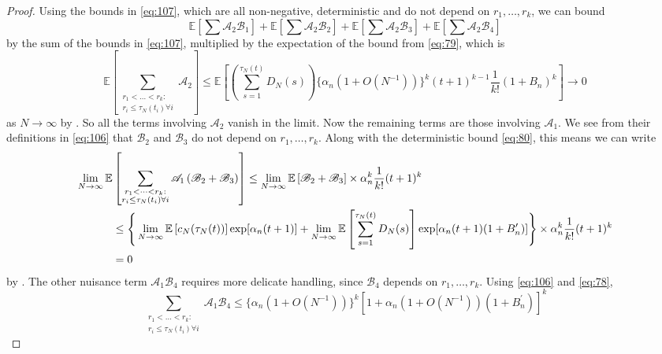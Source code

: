 \documentclass{article}
\newcommand{\E}{\mathbb{E}}
\newcommand{\1}[1]{\mathbbm{1}_{#1}}
\begin{document}
\begin{proof}
Using the bounds in \eqref{eq:107}, which are all non-negative, deterministic and do not depend on $r_1,\dots,r_k$, we can bound
\begin{equation}
\E\left[ \sum \mathscr{A}_2 \mathscr{B}_1 \right] + \E\left[ \sum \mathscr{A}_2 \mathscr{B}_2 \right] + \E\left[ \sum \mathscr{A}_2 \mathscr{B}_3 \right] + \E\left[ \sum \mathscr{A}_2 \mathscr{B}_4 \right]
\end{equation}
by the sum of the bounds in \eqref{eq:107}, multiplied by the expectation of the bound from \eqref{eq:79}, which is
\begin{equation}
\E\left[ \sum_{\substack{r_1 <\dots< r_k :\\ r_i \leq \tau_N(t_i) \forall i}} \mathscr{A}_2 \right]
\leq \E\left[ \left( \sum_{s=1}^{\tau_N(t)} D_N(s) \right) \{ \alpha_n (1+O(N^{-1})) \}^k (t+1)^{k-1} \frac{1}{k!} (1+B_n)^k \right]
\longrightarrow 0
\end{equation}
as $N\to\infty$ by \citet[Equation (4)]{brown2020}. 
So all the terms involving $\mathscr{A}_2$ vanish in the limit.
Now the remaining terms are those involving $\mathscr{A}_1$.
We see from their definitions in \eqref{eq:106} that $\mathscr{B}_2$ and $\mathscr{B}_3$ do not depend on $r_1,\dots, r_k$. Along with the deterministic bound \eqref{eq:80}, this means we can write
\begin{align}
\lim_{N\to\infty} \E&\left[ \sum_{\substack{r_1 <\dots< r_k :\\ r_i \leq \tau_N(t_i) \forall i}} \mathscr{A}_1 \left( \mathscr{B}_2 + \mathscr{B}_3 \right) \right]
\leq \lim_{N\to\infty} \E\left[ \mathscr{B}_2 + \mathscr{B}_3 \right] \times
\alpha_n^k \frac{1}{k!} (t+1)^k \notag\\
&\leq \Bigg\{
\lim_{N\to\infty} \E\left[ c_N(\tau_N(t)) \right] \exp[ \alpha_n (t+1) ]
+ \lim_{N\to\infty} \E\left[ \sum_{s=1}^{\tau_N(t)} D_N(s) \right] 
\exp[ \alpha_n (t+1) (1+B_n^\prime) ]
\Bigg\} \times \alpha_n^k \frac{1}{k!} (t+1)^k \notag\\
&=0
\end{align}
by \citet[Equations (3)--(4)]{brown2020}.
The other nuisance term $\mathscr{A}_1 \mathscr{B}_4$ requires more delicate handling, since $\mathscr{B}_4$ depends on $r_1, \dots, r_k$. Using \eqref{eq:106} and \eqref{eq:78},
\begin{equation}
\sum_{\substack{r_1 <\dots< r_k :\\ r_i \leq \tau_N(t_i) \forall i}} \mathscr{A}_1 \mathscr{B}_4
\leq \{ \alpha_n (1+O(N^{-1})) \}^k
\left[ 1 + \alpha_n (1+O(N^{-1})) (1 + B_n^\prime) \right]^k

\end{equation}
\end{proof}
\end{document}
